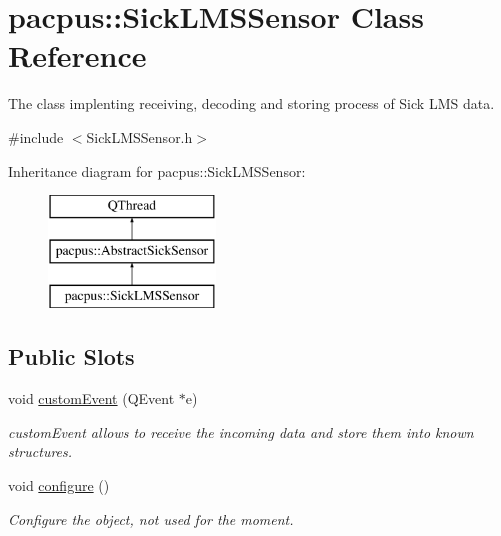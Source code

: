 \hypertarget{classpacpus_1_1SickLMSSensor}{\section{pacpus\-:\-:Sick\-L\-M\-S\-Sensor Class Reference}
\label{classpacpus_1_1SickLMSSensor}
}


The class implenting receiving, decoding and storing process of Sick L\-M\-S data.  




{\ttfamily \#include $<$Sick\-L\-M\-S\-Sensor.\-h$>$}

Inheritance diagram for pacpus\-:\-:Sick\-L\-M\-S\-Sensor\-:\begin{figure}[H]
\begin{center}
\leavevmode
\includegraphics[height=3.000000cm]{classpacpus_1_1SickLMSSensor}
\end{center}
\end{figure}
\subsection*{Public Slots}
\begin{DoxyCompactItemize}
\item 
void \hyperlink{classpacpus_1_1SickLMSSensor_a1ec604914c64ed7d5d884ae55472499f}{custom\-Event} (Q\-Event $\ast$e)
\begin{DoxyCompactList}\small\item\em custom\-Event allows to receive the incoming data and store them into known structures. \end{DoxyCompactList}\item 
\hypertarget{classpacpus_1_1SickLMSSensor_a31986523670fd4ca7173a30bc40688b4}{void \hyperlink{classpacpus_1_1SickLMSSensor_a31986523670fd4ca7173a30bc40688b4}{configure} ()}\label{classpacpus_1_1SickLMSSensor_a31986523670fd4ca7173a30bc40688b4}

\begin{DoxyCompactList}\small\item\em Configure the object, not used for the moment. \end{DoxyCompactList}\end{DoxyCompactItemize}
